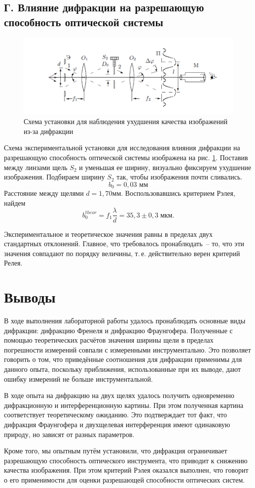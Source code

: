 \documentclass[a4paper,12pt]{article} %
\begin{document}
\subsection*{Г. Влияние дифракции на разрешающую способность оптической системы}
\begin{figure}
    \centering
    \includegraphics{6.png}
    \caption{Схема установки для наблюдения ухудшения качества изображений из-за дифракции}
    \label{fig:bad}
\end{figure}

Схема экспериментальной установки для исследования влияния дифракции на разрешающую способность оптической системы изображена на рис. \ref{fig:bad}.
Поставив между линзами щель $S_2$ и уменьшая ее ширину, визуально фиксируем ухудшение изображения. Подбираем ширину $S_2$ так, чтобы изображения почти сливались.
\[b_0 = 0,03\text{ мм}\]
Расстояние между щелями $d = 1,70 \text{мм}$. Воспользовавшись критерием Рэлея, найдем
\begin{equation}
    b_0^{theor} = f_1 \frac{\lambda}{d} = 35,3 \pm 0,3\; \text{мкм}.
\end{equation}

Экспериментальное и теоретическое значения равны в пределах двух стандартных отклонений. Главное, что требовалось пронаблюдать~-- то, что эти значения совпадают по порядку величины, т.\,е. действительно верен критерий Релея.

\section{Выводы}

В ходе выполнения лабораторной работы удалось пронаблюдать основные виды дифракции: дифракцию Френеля и дифракцию Фраунгофера. Полученные с помощью теоретических расчётов значения ширины щели в пределах погрешности измерений совпали с измеренными инструментально. Это позволяет говорить о том, что приведённые соотношения для дифракции применимы для данного опыта, поскольку приближения, использованные при их выводе, дают ошибку измерений не больше инструментальной.

В ходе опыта на дифракцию на двух щелях удалось получить одновременно дифракционную и интерференционную картины. При этом полученная картина соответствует теоретическому ожиданию. Это подтверждает тот факт, что дифракция Фраунгофера и двухщелевая интерференция имеют одинаковую природу, но зависят от разных параметров.

Кроме того, мы опытным путём установили, что дифракция ограничивает разрешающую способность оптического инструмента, что приводит к снижению качества изображения. При этом критерий Рэлея оказался выполнен, что говорит о его применимости для оценки разрешающей способности оптических систем.
\end{document}
